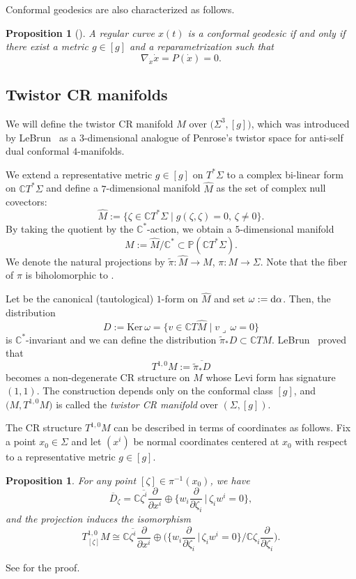 \documentclass[11pt]{article}
\numberwithin{equation}{section}
\newcommand\ol{\overline}
\numberwithin{equation}{section}
\newtheorem{Proposition}[Theorem]{Proposition}
 { \theoremstyle{definition}
\newtheorem{Definition}[Theorem]{Definition}
\newtheorem*{Notation}{Notation}
\newtheorem{Example}[Theorem]{Example}
\newtheorem{Remark}[Theorem]{Remark} }
\begin{document}
Conformal geodesics are also characterized as follows.

\begin{Proposition}[{\cite[Proposition 3.3]{BE}}]\label{conf-geod-characterization}
A regular curve $x(t)$ is a conformal geodesic if and only if there exist a metric $g\in[g]$ and a reparametrization such that
\[
\nabla_{\dot x}\dot x=P(\dot x)=0.
\]
\end{Proposition}

\subsection{Twistor CR manifolds}
We will define the twistor CR manifold $M$ over $\bigl(\Sigma^3, [g]\bigr)$, which was introduced by LeBrun~\cite{LeB} as a $3$-dimensional analogue of Penrose's twistor space for anti-self dual conformal $4$-manifolds.

We extend a representative metric $g\in[g]$ on $T^*\Sigma$ to a complex bi-linear form on $\mathbb{C}T^*\Sigma$ and define a $7$-dimensional manifold $\hat M$ as the set of complex null covectors:
\[
\hat M:=\{\zeta\in\mathbb{C}T^*\Sigma\mid g(\zeta, \zeta)=0,\, \zeta\neq0\}.
\]
By taking the quotient by the $\mathbb{C}^*$-action, we obtain a $5$-dimensional manifold
\[
M:=\hat M/\mathbb{C}^*\subset \mathbb{P}(\mathbb{C}T^*\Sigma).
\]
We denote the natural projections by $\tilde\pi\colon \hat M\to M$, $\pi\colon M\to \Sigma$. Note that the fiber of $\pi$ is biholomorphic to .

Let
 be the canonical (tautological) $1$-form on
$\hat M$ and set $\omega:={\rm d}\alpha$. Then, the distribution
\[
 D:=\textrm{Ker}\, \omega=\bigl\{v\in \mathbb{C}T\hat M\mid v\lrcorner\, \omega=0\bigr\}
\]
is $\mathbb{C}^*$-invariant and we can define the distribution $\tilde\pi_* D\subset \mathbb{C}TM$. LeBrun~\cite{LeB} proved that
\[
T^{1, 0}M:=\ol{\tilde\pi_* D}
\]
becomes a non-degenerate CR structure on $M$ whose Levi form has signature $(1, 1)$. The construction depends only on the conformal class $[g]$, and $\bigl(M, T^{1, 0}M\bigr)$ is called the {\it twistor CR manifold} over $(\Sigma, [g])$.

The CR structure $T^{1, 0}M$ can be described in terms of coordinates as follows.
Fix a point $x_0\in \Sigma$ and let $(x^i)$ be normal coordinates centered at $x_0$ with respect to a representative metric $g\in[g]$.
\begin{Proposition}\label{D}
For any point $[\zeta]\in \pi^{-1}(x_0)$, we have
\[
\ol D_{\zeta}=\mathbb{C}\ol{\zeta^i}\frac{\partial}{\partial x^i}\oplus \biggl\{ w_i\frac{\partial}{\partial \zeta_i} \, \bigg|\, \zeta_i w^i=0\biggr\},
\]
and the projection \smash{$\tilde\pi_*\colon \ol D_{\zeta}\to T^{1. 0}_{[\zeta]} M$} induces the isomorphism
\[
T^{1, 0}_{[\zeta]} M\cong\mathbb{C}\ol{\zeta^i}\frac{\partial}{\partial x^i}\oplus \biggl(\biggl\{ w_i\frac{\partial}{\partial \zeta_i}\, \bigg|\, \zeta_i w^i=0\biggr\}\Big/\mathbb{C}\zeta_i\frac{\partial}{\partial \zeta_i}\biggr).
\]
\end{Proposition}
See \cite[Proposition 6.1]{Mar} for the proof.
\end{document}
